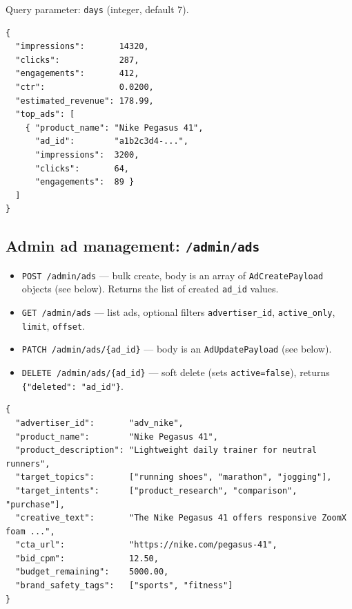 \begin{appendices}
Query parameter: \texttt{days} (integer, default 7).

\begin{lstlisting}[style=jsonstyle, caption={\texttt{GET /analytics/summary} response.}]
{
  "impressions":       14320,
  "clicks":            287,
  "engagements":       412,
  "ctr":               0.0200,
  "estimated_revenue": 178.99,
  "top_ads": [
    { "product_name": "Nike Pegasus 41",
      "ad_id":        "a1b2c3d4-...",
      "impressions":  3200,
      "clicks":       64,
      "engagements":  89 }
  ]
}
\end{lstlisting}

\subsection*{Admin ad management: \texttt{/admin/ads}}

\begin{itemize}[leftmargin=1.5em, itemsep=0.2em]
  \item \texttt{POST /admin/ads} --- bulk create, body is an array of
        \texttt{AdCreatePayload} objects (see below). Returns the list
        of created \texttt{ad\_id} values.
  \item \texttt{GET /admin/ads} --- list ads, optional filters
        \texttt{advertiser\_id}, \texttt{active\_only}, \texttt{limit},
        \texttt{offset}.
  \item \texttt{PATCH /admin/ads/\{ad\_id\}} --- body is an
        \texttt{AdUpdatePayload} (see below).
  \item \texttt{DELETE /admin/ads/\{ad\_id\}} --- soft delete (sets
        \texttt{active=false}), returns \texttt{\{"deleted": "ad\_id"\}}.
\end{itemize}

\begin{lstlisting}[style=jsonstyle, caption={\texttt{AdCreatePayload} schema.}]
{
  "advertiser_id":       "adv_nike",
  "product_name":        "Nike Pegasus 41",
  "product_description": "Lightweight daily trainer for neutral runners",
  "target_topics":       ["running shoes", "marathon", "jogging"],
  "target_intents":      ["product_research", "comparison", "purchase"],
  "creative_text":       "The Nike Pegasus 41 offers responsive ZoomX foam ...",
  "cta_url":             "https://nike.com/pegasus-41",
  "bid_cpm":             12.50,
  "budget_remaining":    5000.00,
  "brand_safety_tags":   ["sports", "fitness"]
}
\end{lstlisting}


\end{appendices}
